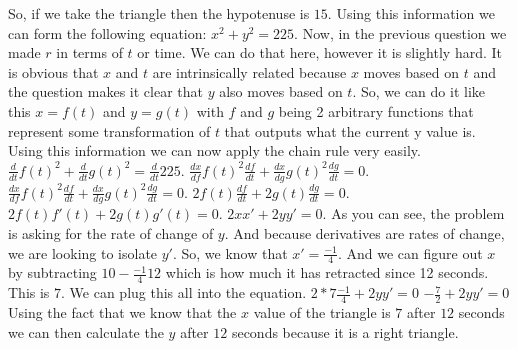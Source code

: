 \documentclass{article}
\begin{document}
\newline
\newline
So, if we take the triangle then the hypotenuse is $15$. Using this information we can form the following equation: $x^2+y^2=225$.
\newline
\newline
Now, in the previous question we made $r$ in terms of $t$ or time. We can do that here, however it is slightly hard. It is obvious that $x$ and $t$ are intrinsically related because $x$ moves based on $t$ and the question makes it clear that $y$ also moves based on $t$. So, we can do it like this $x = f(t)$ and $y = g(t)$ with $f$ and $g$ being 2 arbitrary functions that represent some transformation of $t$ that outputs what the current y value is. Using this information we can now apply the chain rule very easily.
\newline
\newline
$\frac{d}{dt}f(t)^2+\frac{d}{dt}g(t)^2=\frac{d}{dt}225$.
\newline
\newline
$\frac{dx}{df}f(t)^2\frac{df}{dt}+\frac{dx}{dg}g(t)^2\frac{dg}{dt}=0$.
\newline
\newline
$\frac{dx}{df}f(t)^2\frac{df}{dt}+\frac{dx}{dg}g(t)^2\frac{dg}{dt}=0$.
\newline
\newline
$2f(t)\frac{df}{dt}+2g(t)\frac{dg}{dt}=0$.
\newline
\newline
$2f(t)f'(t)+2g(t)g'(t)=0$.
\newline
\newline
$2xx'+2yy'=0$.
\newline
\newline
As you can see, the problem is asking for the rate of change of $y$. And because derivatives are rates of change, we are looking to isolate $y'$. So, we know that $x' = \frac{-1}{4}$. And we can figure out $x$ by subtracting $10-\frac{-1}{4}12$ which is how much it has retracted since 12 seconds. This is $7$. We can plug this all into the equation.
\newline
\newline
$2*7\frac{-1}{4}+2yy'=0$
\newline
\newline
$-\frac{7}{2}+2yy'=0$
\newline
\newline
Using the fact that we know that the $x$ value of the triangle is $7$ after $12$ seconds we can then calculate the $y$ after $12$ seconds because it is a right triangle.
\end{document}
